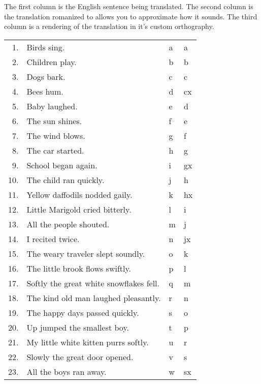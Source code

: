 The first column is the English sentence being translated.
The second column is the translation romanized to allows you to approximate how it sounds.
The third column is a rendering of the translation in it's custom orthography.

\begin{tabular}{rlll}
 1.&Birds sing.                            &a &{\confont a} \\
 2.&Children play.                         &b &{\confont b} \\
 3.&Dogs bark.                             &c &{\confont c} \\
 4.&Bees hum.                              &d &{\confont cx}\\
 5.&Baby laughed.                          &e &{\confont d} \\
 6.&The sun shines.                        &f &{\confont e} \\
 7.&The wind blows.                        &g &{\confont f} \\
 8.&The car started.                       &h &{\confont g} \\
 9.&School began again.                    &i &{\confont gx}\\
10.&The child ran quickly.                 &j &{\confont h} \\
11.&Yellow daffodils nodded gaily.         &k &{\confont hx}\\
12.&Little Marigold cried bitterly.        &l &{\confont i} \\
13.&All the people shouted.                &m &{\confont j} \\
14.&I recited twice.                       &n &{\confont jx}\\
15.&The weary traveler slept soundly.      &o &{\confont k} \\
16.&The little brook flows swiftly.        &p &{\confont l} \\
17.&Softly the great white snowflakes fell.&q &{\confont m} \\
18.&The kind old man laughed pleasantly.   &r &{\confont n} \\
19.&The happy days passed quickly.         &s &{\confont o} \\
20.&Up jumped the smallest boy.            &t &{\confont p} \\
21.&My little white kitten purrs softly.   &u &{\confont r} \\
22.&Slowly the great door opened.          &v &{\confont s} \\
23.&All the boys ran away.                 &w &{\confont sx}\\

\end{tabular}
